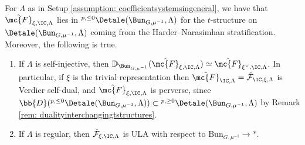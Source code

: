 \documentclass[letterpaper,11pt]{amsart}
\begin{document}
\begin{theorem}{\label{thm: perversityofICIgs}}
For $\Lambda$ as in Setup \ref{assumption: coefficientsystemsingeneral}, we have that $\hat{\mc{F}}_{\xi,\IC,\Lambda}$ lies in $\phantom{}^{p, \leq 0}\Detale(\Bun_{G,\mu^{-1}},\Lambda)$ for the $t$-structure on $\Detale(\Bun_{G,\mu^{-1}},\Lambda)$ coming from the Harder--Narasimhan stratification. Moreover, the following is true. 
\begin{enumerate}
\item If $\Lambda$ is self-injective, then $\mathbb{D}_{\Bun_{G,\mu^{-1}}}(\hat{\mc{F}}_{\xi,\IC,\Lambda})\simeq \hat{\mc{F}}_{\xi^{\vee},\IC,\Lambda}$. In particular, if $\xi$ is the trivial representation then $\hat{\mc{F}}_{\IC,\Lambda} = \hat{\mathcal{F}}_{\IC,\xi,\Lambda}$ is Verdier self-dual, and $\hat{\mc{F}}_{\xi,\IC,\Lambda}$ is perverse, since $\bb{D}(\phantom{}^{p, \leq 0}\Detale(\Bun_{G,\mu^{-1}},\Lambda)) \subset \phantom{}^{p, \geq 0}\Detale(\Bun_{G,\mu^{-1}},\Lambda)$ by Remark \ref{rem: dualityinterchangingtstructures}.
\item If $\Lambda$ is regular, then $\hat{\mathcal{F}}_{\xi,\IC,\Lambda}$ is ULA with respect to $\mathrm{Bun}_{G,\mu^{-1}} \to *$.
\end{enumerate}
\end{theorem}
\end{document}
